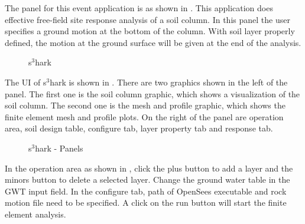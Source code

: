 The panel for this event application is as shown in . 
This application does effective free-field site response analysis of a soil column.
In this panel the user specifies a ground motion at the bottom of the column. 
With soil layer properly defined, the motion at the ground surface will be given at the end of the analysis.
\begin{figure}[!htbp]
  \caption{s$^3$hark}
  \label{fig:s3hark0}
\end{figure}

The UI of s$^3$hark is shown in .
There are two graphics shown in the left of the panel. The first one is the soil column graphic, 
which shows a visualization of the soil column.
The second one is the mesh and profile graphic, 
which shows the finite element mesh and profile plots.
On the right of the panel are operation area, soil design table, configure tab, layer property tab and response tab. 


\begin{figure}[!htbp]
  \caption{s$^3$hark - Panels}
  \label{fig:s3hark1}
\end{figure}

In the operation area as shown in , click the plus button to add a layer and the minors button to delete a selected layer. 
Change the ground water table in the GWT input field. 
In the configure tab, path of OpenSees executable and rock motion file need to be specified.
A click on the run button will start the finite element analysis.


